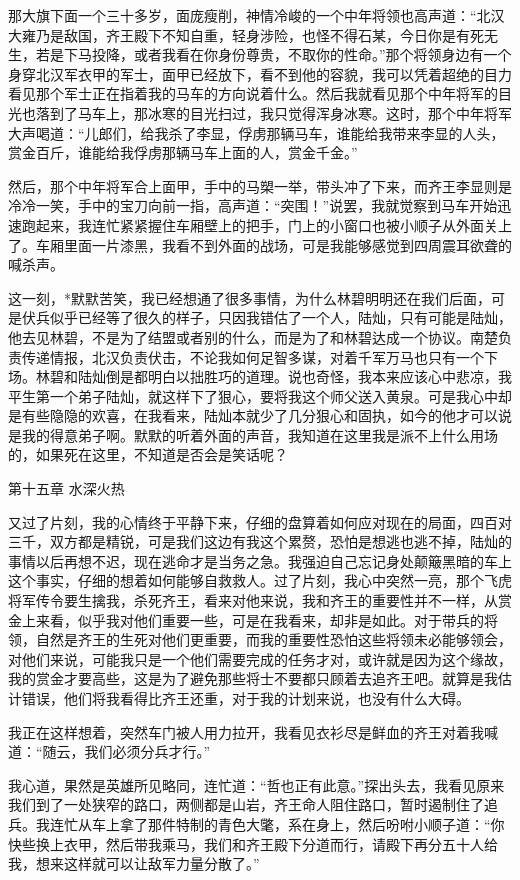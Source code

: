 那大旗下面一个三十多岁，面庞瘦削，神情冷峻的一个中年将领也高声道：“北汉大雍乃是敌国，齐王殿下不知自重，轻身涉险，也怪不得石某，今日你是有死无生，若是下马投降，或者我看在你身份尊贵，不取你的性命。”那个将领身边有一个身穿北汉军衣甲的军士，面甲已经放下，看不到他的容貌，我可以凭着超绝的目力看见那个军士正在指着我的马车的方向说着什么。然后我就看见那个中年将军的目光也落到了马车上，那冰寒的目光扫过，我只觉得浑身冰寒。这时，那个中年将军大声喝道：“儿郎们，给我杀了李显，俘虏那辆马车，谁能给我带来李显的人头，赏金百斤，谁能给我俘虏那辆马车上面的人，赏金千金。”

然后，那个中年将军合上面甲，手中的马槊一举，带头冲了下来，而齐王李显则是冷冷一笑，手中的宝刀向前一指，高声道：“突围！”说罢，我就觉察到马车开始迅速跑起来，我连忙紧紧握住车厢壁上的把手，门上的小窗口也被小顺子从外面关上了。车厢里面一片漆黑，我看不到外面的战场，可是我能够感觉到四周震耳欲聋的喊杀声。

这一刻，*默默苦笑，我已经想通了很多事情，为什么林碧明明还在我们后面，可是伏兵似乎已经等了很久的样子，只因我错估了一个人，陆灿，只有可能是陆灿，他去见林碧，不是为了结盟或者别的什么，而是为了和林碧达成一个协议。南楚负责传递情报，北汉负责伏击，不论我如何足智多谋，对着千军万马也只有一个下场。林碧和陆灿倒是都明白以拙胜巧的道理。说也奇怪，我本来应该心中悲凉，我平生第一个弟子陆灿，就这样下了狠心，要将我这个师父送入黄泉。可是我心中却是有些隐隐的欢喜，在我看来，陆灿本就少了几分狠心和固执，如今的他才可以说是我的得意弟子啊。默默的听着外面的声音，我知道在这里我是派不上什么用场的，如果死在这里，不知道是否会是笑话呢？

第十五章    水深火热

又过了片刻，我的心情终于平静下来，仔细的盘算着如何应对现在的局面，四百对三千，双方都是精锐，可是我们这边有我这个累赘，恐怕是想逃也逃不掉，陆灿的事情以后再想不迟，现在逃命才是当务之急。我强迫自己忘记身处颠簸黑暗的车上这个事实，仔细的想着如何能够自救救人。过了片刻，我心中突然一亮，那个飞虎将军传令要生擒我，杀死齐王，看来对他来说，我和齐王的重要性并不一样，从赏金上来看，似乎我对他们重要一些，可是在我看来，却非是如此。对于带兵的将领，自然是齐王的生死对他们更重要，而我的重要性恐怕这些将领未必能够领会，对他们来说，可能我只是一个他们需要完成的任务才对，或许就是因为这个缘故，我的赏金才要高些，这是为了避免那些将士不要都只顾着去追齐王吧。就算是我估计错误，他们将我看得比齐王还重，对于我的计划来说，也没有什么大碍。

我正在这样想着，突然车门被人用力拉开，我看见衣衫尽是鲜血的齐王对着我喊道：“随云，我们必须分兵才行。”

我心道，果然是英雄所见略同，连忙道：“哲也正有此意。”探出头去，我看见原来我们到了一处狭窄的路口，两侧都是山岩，齐王命人阻住路口，暂时遏制住了追兵。我连忙从车上拿了那件特制的青色大氅，系在身上，然后吩咐小顺子道：“你快些换上衣甲，然后带我乘马，我们和齐王殿下分道而行，请殿下再分五十人给我，想来这样就可以让敌军力量分散了。”

